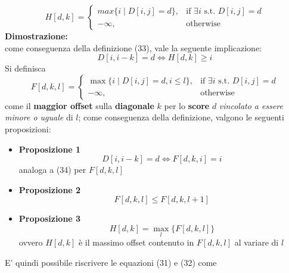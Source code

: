 \documentclass{article}
\begin{document}
\begin{equation}
    H[d, k] = \begin{cases}
        max\{i \mid D[i, j] = d\}, & \text{if } \exists i \text{ s.t. } D[i,j] = d \\
        - \infty, & \text{otherwise}
    \end{cases}
\end{equation}
\textbf{Dimostrazione:} \\
come conseguenza della definizione (33), vale la seguente implicazione:
\begin{equation}
    D[i, i-k] = d \iff H[d,k] \geq i
\end{equation}
Si definisca 
\begin{equation}
    F[d, k, l] = \begin{cases}
        \max \{i \mid D[i, j] = d, i \leq l \}, & \text{if } \exists i \text{ s.t. } D[i,j] = d \\
        - \infty, & \text{otherwise}
    \end{cases}
\end{equation}
come il \textbf{maggior offset} sulla \textbf{diagonale} $k$ per lo \textbf{score} $d$ \emph{vincolato a essere minore o uguale} di $l$; come conseguenza della definizione, valgono le seguenti proposizioni:

\begin{itemize}
    \item \textbf{Proposizione 1}
    $$D[i, i-k] = d \iff F[d, k, i] = i$$ 
    analoga a (34) per $F[d,k,l]$
    
    \item \textbf{Proposizione 2}
    $$F[d, k, l] \leq F[d, k, l + 1]$$
    
    \item \textbf{Proposizione 3}
    $$H[d, k] = \max_l \{ F[d, k, l] \}$$
    ovvero $H[d, k]$ è il massimo offset contenuto in $F[d,k,l]$ al variare di $l$
\end{itemize}
E' quindi possibile riscrivere le equazioni (31) e (32) come
\end{document}
